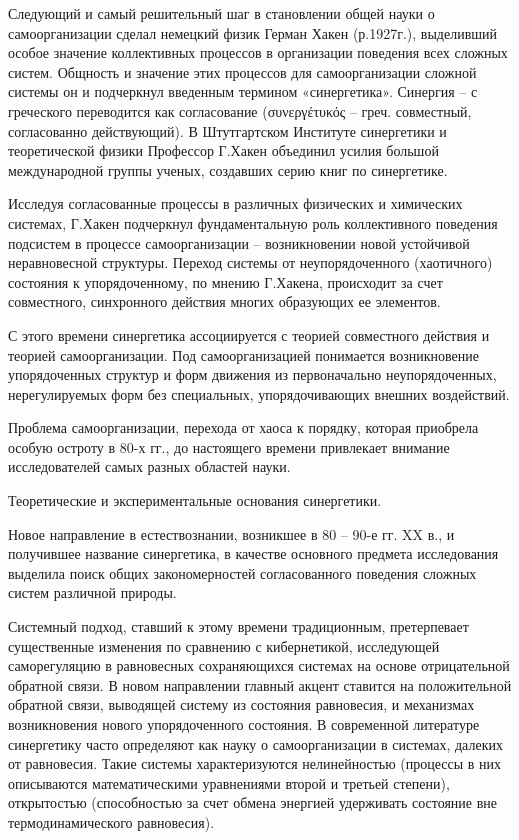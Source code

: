 \documentclass[exam_answers.tex]{subfiles}
\begin{document}
Следующий и самый решительный шаг в становлении общей науки о
самоорганизации сделал немецкий физик Герман Хакен (р.1927г.), выделивший
особое значение коллективных процессов в организации поведения всех
сложных систем. Общность и значение этих процессов для самоорганизации
сложной системы он и подчеркнул введенным термином «синергетика».
Синергия – с греческого переводится как согласование (συνεργέτυκός – греч.
совместный, согласованно действующий). В Штутгартском Институте
синергетики и теоретической физики Профессор Г.Хакен объединил усилия
большой международной группы ученых, создавших серию книг по
синергетике.

Исследуя согласованные процессы в различных физических и химических
системах, Г.Хакен подчеркнул фундаментальную роль коллективного
поведения подсистем в процессе самоорганизации – возникновении новой
устойчивой неравновесной структуры. Переход системы от неупорядоченного
(хаотичного) состояния к упорядоченному, по мнению Г.Хакена, происходит за
счет совместного, синхронного действия многих образующих ее элементов.

С этого времени синергетика ассоциируется с теорией совместного
действия и теорией самоорганизации. Под самоорганизацией понимается
возникновение упорядоченных структур и форм движения из первоначально
неупорядоченных, нерегулируемых форм без специальных, упорядочивающих
внешних воздействий.

Проблема самоорганизации, перехода от хаоса к порядку, которая
приобрела особую остроту в 80-х гг., до настоящего времени привлекает
внимание исследователей самых разных областей науки.

Теоретические и экспериментальные основания синергетики.

Новое направление в естествознании, возникшее в 80 – 90-е гг. XX в., и
получившее название синергетика, в качестве основного предмета
исследования выделила поиск общих закономерностей согласованного
поведения сложных систем различной природы.

Системный подход, ставший к этому времени традиционным, претерпевает
существенные изменения по сравнению с кибернетикой, исследующей
саморегуляцию в равновесных сохраняющихся системах на основе
отрицательной обратной связи. В новом направлении главный акцент ставится
на положительной обратной связи, выводящей систему из состояния
равновесия, и механизмах возникновения нового упорядоченного состояния. В
современной литературе синергетику часто определяют как науку о
самоорганизации в системах, далеких от равновесия. Такие системы
характеризуются нелинейностью (процессы в них описываются
математическими уравнениями второй и третьей степени), открытостью
(способностью за счет обмена энергией удерживать состояние вне
термодинамического равновесия).
\end{document}
